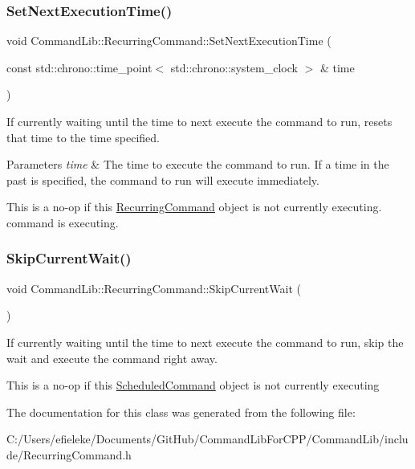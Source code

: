 \subsubsection{\texorpdfstring{Set\+Next\+Execution\+Time()}{SetNextExecutionTime()}}
{\footnotesize\ttfamily void Command\+Lib\+::\+Recurring\+Command\+::\+Set\+Next\+Execution\+Time (\begin{DoxyParamCaption}\item[{const std\+::chrono\+::time\+\_\+point$<$ std\+::chrono\+::system\+\_\+clock $>$ \&}]{time }\end{DoxyParamCaption})}



If currently waiting until the time to next execute the command to run, resets that time to the time specified. 


\begin{DoxyParams}{Parameters}
{\em time} & The time to execute the command to run. If a time in the past is specified, the command to run will execute immediately. \\
\hline
\end{DoxyParams}


This is a no-\/op if this \mbox{\hyperlink{class_command_lib_1_1_recurring_command}{Recurring\+Command}} object is not currently executing. command is executing. \mbox{\label{class_command_lib_1_1_recurring_command_a11e19f7c0cbc93c33e36f6c75d858b0f}} 
\subsubsection{\texorpdfstring{Skip\+Current\+Wait()}{SkipCurrentWait()}}
{\footnotesize\ttfamily void Command\+Lib\+::\+Recurring\+Command\+::\+Skip\+Current\+Wait (\begin{DoxyParamCaption}{ }\end{DoxyParamCaption})}



If currently waiting until the time to next execute the command to run, skip the wait and execute the command right away.

This is a no-\/op if this \mbox{\hyperlink{class_command_lib_1_1_scheduled_command}{Scheduled\+Command}} object is not currently executing

The documentation for this class was generated from the following file\+:\begin{DoxyCompactItemize}
\item 
C\+:/\+Users/efieleke/\+Documents/\+Git\+Hub/\+Command\+Lib\+For\+C\+P\+P/\+Command\+Lib/include/Recurring\+Command.\+h\end{DoxyCompactItemize}
